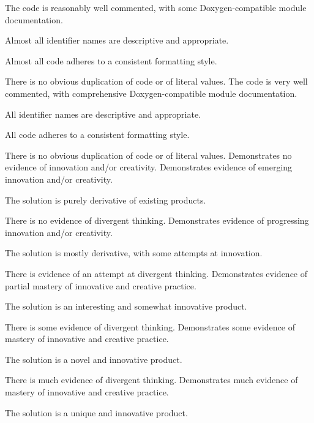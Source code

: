 \documentclass{../fal_assignment}
\begin{document}
\begin{markingrubric}
        \grade The code is reasonably well commented, with some Doxygen-compatible module documentation.
            \par Almost all identifier names are descriptive and appropriate.
            \par Almost all code adheres to a consistent formatting style.
             \par There is no obvious duplication of code or of literal values. %
        \grade The code is very well commented, with comprehensive Doxygen-compatible module documentation.
            \par All identifier names are descriptive and appropriate.
            \par All code adheres to a consistent formatting style.
             \par There is no obvious duplication of code or of literal values. %
%
        \grade\fail Demonstrates no evidence of innovation and/or creativity.
        \grade Demonstrates evidence of emerging innovation and/or creativity.
            \par The solution is purely derivative of existing products.
            \par There is no evidence of divergent thinking.
        \grade Demonstrates evidence of progressing innovation and/or creativity.
            \par The solution is mostly derivative, with some attempts at innovation.
            \par There is evidence of an attempt at divergent thinking.
        \grade Demonstrates evidence of partial mastery of innovative and creative practice.
            \par The solution is an interesting and somewhat innovative product.
            \par There is some evidence of divergent thinking.
        \grade Demonstrates some evidence of mastery of innovative and creative practice.
            \par The solution is a novel and innovative product.
            \par There is much evidence of divergent thinking.
        \grade Demonstrates much evidence of mastery of innovative and creative practice.
            \par The solution is a unique and innovative product.

\end{markingrubric}
\end{document}
